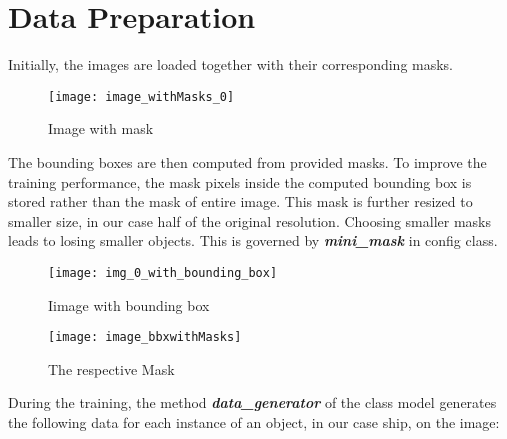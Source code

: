 \section{Data Preparation}
\label{sec:datapreparation}

Initially, the images are loaded together with their corresponding masks.
\begin{figure}[h!]
  \centering
  \texttt{[image: image\_withMasks\_0]}
  \caption[Random image with mask]
   {Image with mask}
   \label{fig:rndimg}
\end{figure}
\newpage
\noindent
The bounding boxes are then computed from provided masks. To improve the training performance, the mask pixels inside the computed bounding box is stored rather than the mask of entire image. This mask is further resized to smaller size, in our case half of the original resolution. Choosing smaller masks leads to losing smaller objects. This is governed by \textbf{\textit{mini\_mask}} in config class. 

\begin{figure}[!htb]
  \texttt{[image: img\_0\_with\_bounding\_box]}
  \caption[Iimage with bounding box]{Iimage with bounding box}\label{fig:imgbbx}
\endminipage\hfill
{}
  \texttt{[image: image\_bbxwithMasks]}
  \caption[The espective Mask]{The respective Mask}\label{fig:maskofbbx}
\endminipage\hfill
\end{figure}

\noindent
During the training, the method \textbf{\textit{data\_generator}} of the class model generates the following data for each instance of an object, in our case ship, on the image:

